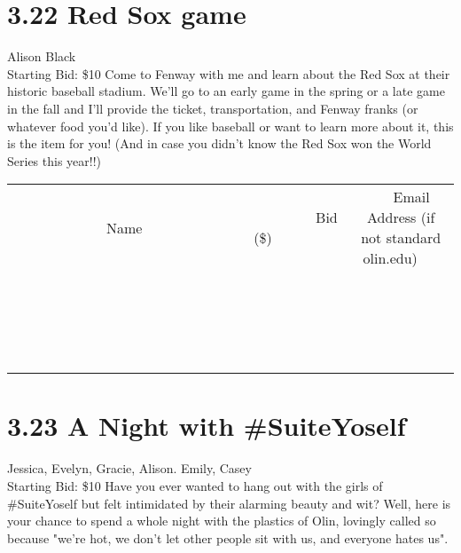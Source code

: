 \documentclass[11pt]{article}
\begin{document}
\section*{3.22 Red Sox game}
Alison Black
\\
Starting Bid: \$10
\newline
Come to Fenway with me and learn about the Red Sox at their historic baseball stadium.  We'll go to an early game in the spring or a late game in the fall and I'll provide the ticket, transportation, and Fenway franks (or whatever food you'd like).  If you like baseball or want to learn more about it, this is the item for you!  (And in case you didn't know the Red Sox won the World Series this year!!)
\\[3ex]
\begin{tabular}{c c c}
~~~~~~~~~~~~~Name~~~~~~~~~~~~~ & ~~~~~~~~~Bid (\$)~~~~~~~~~  & ~~~Email Address (if not standard olin.edu)~~~\\
 & & \\
\hline
 & & \\
\hline
 & & \\
\hline
 & & \\
\hline
 & & \\
\hline
 & & \\
\hline
 & & \\
\hline
 & & \\
\hline
 & & \\
\hline
 & & \\
\hline
 & & \\
\hline
 & & \\
\hline
 & & \\
\hline
 & & \\
\hline
 & & \\
\hline
 & & \\
\hline
 & & \\
\hline
 & & \\
\hline
 & & \\
\hline
\end{tabular}
\newpage
\section*{3.23 A Night with \#SuiteYoself}
Jessica, Evelyn, Gracie, Alison. Emily, Casey
\\
Starting Bid: \$10
\newline
Have you ever wanted to hang out with the girls of \#SuiteYoself but felt intimidated by their alarming beauty and wit? Well, here is your chance to spend a whole night with the plastics of Olin, lovingly called so because "we're hot, we don't let other people sit with us, and everyone hates us".
\end{document}
